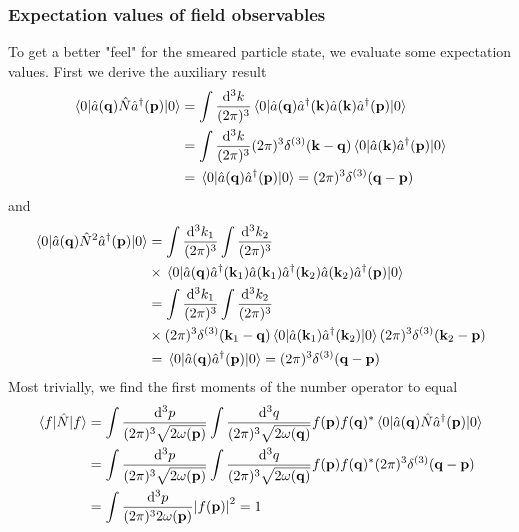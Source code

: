 \subsubsection{Expectation values of field observables}

To get a better "feel" for the smeared particle state, we evaluate some expectation values.
First we derive the auxiliary result
\begin{equation}
	\begin{split}
		\expval{
			\hat{a}(\vb{q})
			\hat{N}
			\hat{a}^\dagger(\vb{p})
		}{0}
		&=
		\int\frac{\dd[3]{k}}{(2\pi)^3}
		\expval{
			\hat{a}(\vb{q})
			\hat{a}^\dagger(\vb{k})
			\hat{a}(\vb{k})
			\hat{a}^\dagger(\vb{p})
		}{0}
		\\
		&=
		\int\frac{\dd[3]{k}}{(2\pi)^3}
		(2\pi)^3\delta^{(3)}(\vb{k}-\vb{q})
		\expval{
			\hat{a}(\vb{k})
			\hat{a}^\dagger(\vb{p})
		}{0}
		\\
		&=
		\expval{
			\hat{a}(\vb{q})
			\hat{a}^\dagger(\vb{p})
		}{0}
		=
		(2\pi)^3\delta^{(3)}(\vb{q}-\vb{p})
	\end{split}
\end{equation}
and
\begin{equation}
	\begin{split}
		\expval{\hat{a}(\vb{q})\hat{N}^2\hat{a}^\dagger(\vb{p})}{0}
		&=
		\int\frac{\dd[3]{k_1}}{(2\pi)^3}
		\int\frac{\dd[3]{k_2}}{(2\pi)^3}
		\\
		&\times
		\expval{
			\hat{a}(\vb{q})
			\hat{a}^\dagger(\vb{k}_1)
			\hat{a}(\vb{k}_1)
			\hat{a}^\dagger(\vb{k}_2)
			\hat{a}(\vb{k}_2)
			\hat{a}^\dagger(\vb{p})
		}{0}
		\\
		&=
		\int\frac{\dd[3]{k_1}}{(2\pi)^3}
		\int\frac{\dd[3]{k_2}}{(2\pi)^3}
		\\
		&\times
		(2\pi)^3\delta^{(3)}(\vb{k}_1-\vb{q})
		\expval{
			\hat{a}(\vb{k}_1)
			\hat{a}^\dagger(\vb{k}_2)
		}{0}
		(2\pi)^3\delta^{(3)}(\vb{k}_2-\vb{p})
		\\
		&=
		\expval{
			\hat{a}(\vb{q})
			\hat{a}^\dagger(\vb{p})
		}{0}
		=
		(2\pi)^3\delta^{(3)}(\vb{q}-\vb{p})
	\end{split}
\end{equation}
Most trivially, we find the first moments of the number operator to equal
\begin{equation}
	\begin{split}
		\expval{\hat{N}}{f}
		&=
		\int\frac{\dd[3]{p}}{(2\pi)^3\sqrt{2\omega(\vb{p})}}
		\int\frac{\dd[3]{q}}{(2\pi)^3\sqrt{2\omega(\vb{q})}}
		f(\vb{p})f(\vb{q})^*
		\expval{\hat{a}(\vb{q})\hat{N}\hat{a}^\dagger(\vb{p})}{0}
		\\
		&=
		\int\frac{\dd[3]{p}}{(2\pi)^3\sqrt{2\omega(\vb{p})}}
		\int\frac{\dd[3]{q}}{(2\pi)^3\sqrt{2\omega(\vb{q})}}
		f(\vb{p})f(\vb{q})^*
		(2\pi)^3\delta^{(3)}(\vb{q}-\vb{p})
		\\
		&=
		\int\frac{\dd[3]{p}}{(2\pi)^32\omega(\vb{p})}
		\abs{f(\vb{p})}^2
		=
		1
	\end{split}
\end{equation}

